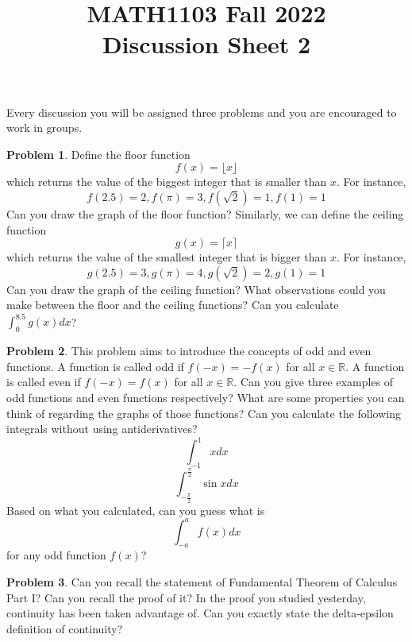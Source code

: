 \documentclass[11pt,oneside]{amsart}
\title{MATH1103 Fall 2022\\
Discussion Sheet 2}
\theoremstyle{definition}
\newtheorem{problem}{Problem}
\begin{document}
    \maketitle
    Every discussion you will be assigned three problems and you are encouraged to work in groups.

    \begin{problem}
        Define the floor function $$f(x)= \lfloor x \rfloor$$ which returns the value of the biggest integer that is smaller than $x$. For instance, $$f(2.5)=2, f(\pi)=3, f(\sqrt{2})=1,f(1)=1$$ Can you draw the graph of the floor function?
        \newline
        Similarly, we can define the ceiling function $$g(x)= \lceil x \rceil$$ which returns the value of the smallest integer that is bigger than $x$. For instance, $$g(2.5)=3, g(\pi)=4, g(\sqrt{2})=2, g(1)=1$$ Can you draw the graph of the ceiling function? What observations could you make between the floor and the ceiling functions? Can you calculate $\int_0^ {8.5} g(x) dx$?
    \end{problem}

    \begin{problem}
       This problem aims to introduce the concepts of odd and even functions. A function is called odd if $f(-x)=-f(x)$ for all $x \in \mathbb{R}$. A function is called even if $f(-x)=f(x)$ for all $x \in \mathbb{R}$. Can you give three examples of odd functions and even functions respectively? What are some properties you can think of regarding the graphs of those functions? Can you calculate the following integrals without using antiderivatives?
       $$ \int_{-1}^ 1 x dx$$
       $$ \int_{-\frac{\pi}{2}}^{\frac{\pi}{2}} \sin x dx$$
       Based on what you calculated, can you guess what is $$\int_{-a}^ a f(x) dx$$ for any odd function $f(x)$?
       
    \end{problem}

    \begin{problem}
        Can you recall the statement of Fundamental Theorem of Calculus Part I? Can you recall the proof of it? In the proof you studied yesterday, continuity has been taken advantage of. Can you exactly state the delta-epsilon definition of continuity?
        
    \end{problem}
\end{document}
